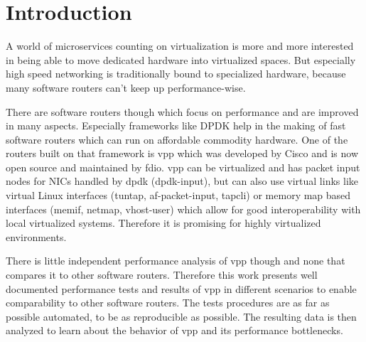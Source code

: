 
\chapter{Introduction}


A world of microservices counting on virtualization is more and
more interested in being able to move dedicated hardware into
virtualized spaces. But especially high speed networking is
traditionally bound to specialized hardware, because many software
routers can't keep up performance-wise.


There are software routers though which focus on performance and are
improved in many aspects. Especially frameworks like DPDK
\cite{inteldpdk} help in the making of fast software routers which can
run on affordable commodity hardware. One of the routers built on that
framework is \Ac{vpp} which was developed by Cisco and is now open
source and maintained by \Ac{fdio}. \Ac{vpp} can be virtualized and
has packet input nodes for NICs handled by \Ac{dpdk} (dpdk-input),
but can also use virtual links like virtual Linux interfaces (tuntap,
af-packet-input, tapcli) or memory map based interfaces (memif,
netmap, vhost-user) which allow for good interoperability with local
virtualized systems. Therefore it is promising for highly virtualized
environments.




There is little independent performance analysis of \Ac{vpp} though
and none that compares it to other software routers. Therefore this
work presents well documented \cite{my:repo} performance tests and
results of \Ac{vpp} in different scenarios to enable comparability to
other software routers. The tests procedures are as far as possible
automated, to be as reproducible as possible. The resulting data is
then analyzed to learn about the behavior of \Ac{vpp} and its
performance bottlenecks.

